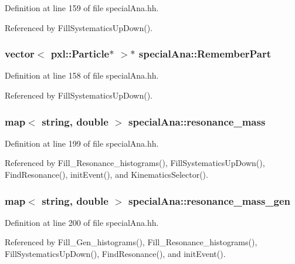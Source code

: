 Definition at line 159 of file special\-Ana.\-hh.



Referenced by Fill\-Systematics\-Up\-Down().

\subsubsection[{Remember\-Part}]{\setlength{\rightskip}{0pt plus 5cm}vector$<$ pxl\-::\-Particle$\ast$ $>$$\ast$ special\-Ana\-::\-Remember\-Part}\label{classspecialAna_a803a475f188fbbe83b866ced8ece1442}


Definition at line 158 of file special\-Ana.\-hh.



Referenced by Fill\-Systematics\-Up\-Down().

\subsubsection[{resonance\-\_\-mass}]{\setlength{\rightskip}{0pt plus 5cm}map$<$ string, double $>$ special\-Ana\-::resonance\-\_\-mass}\label{classspecialAna_a1af23a7951217b703465b152e08d8ec6}


Definition at line 199 of file special\-Ana.\-hh.



Referenced by Fill\-\_\-\-Resonance\-\_\-histograms(), Fill\-Systematics\-Up\-Down(), Find\-Resonance(), init\-Event(), and Kinematics\-Selector().

\subsubsection[{resonance\-\_\-mass\-\_\-gen}]{\setlength{\rightskip}{0pt plus 5cm}map$<$ string, double $>$ special\-Ana\-::resonance\-\_\-mass\-\_\-gen}\label{classspecialAna_aa0c7fe4e8cb8142f2f8f4c4967e658b2}


Definition at line 200 of file special\-Ana.\-hh.



Referenced by Fill\-\_\-\-Gen\-\_\-histograms(), Fill\-\_\-\-Resonance\-\_\-histograms(), Fill\-Systematics\-Up\-Down(), Find\-Resonance(), and init\-Event().

